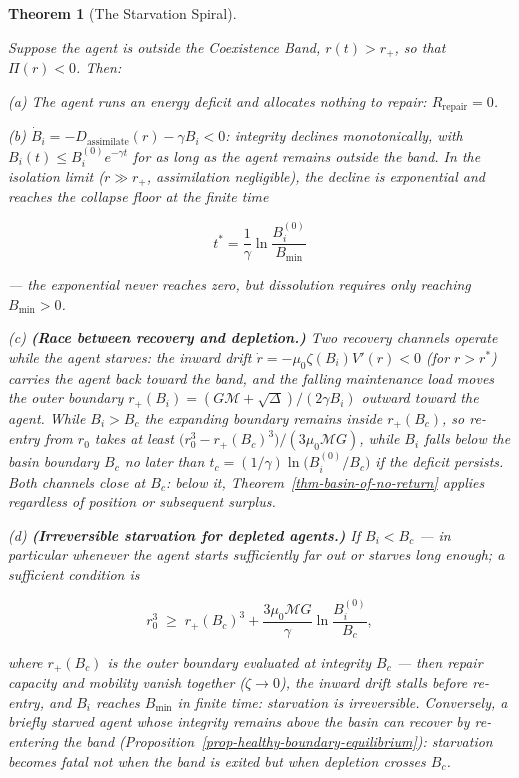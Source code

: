 \documentclass[11pt]{article}
\theoremstyle{plain}
\newtheorem{theorem}{Theorem}
\theoremstyle{definition}
\theoremstyle{remark}
\begin{document}
\begin{theorem}[The Starvation Spiral]
\label{thm-starvation-spiral}

Suppose the agent is outside the Coexistence Band, $r(t) > r_+$, so that $\Pi(r) < 0$. Then:

(a) The agent runs an energy deficit and allocates nothing to repair: $R_{\text{repair}} = 0$.

(b) $\dot{B}_i = -D_{\text{assimilate}}(r) - \gamma B_i < 0$: integrity declines monotonically, with $B_i(t) \leq B_i^{(0)} e^{-\gamma t}$ for as long as the agent remains outside the band. In the isolation limit ($r \gg r_+$, assimilation negligible), the decline is exponential and reaches the collapse floor at the finite time

$$t^* = \frac{1}{\gamma} \ln \frac{B_i^{(0)}}{B_{\min}}$$

— the exponential never reaches zero, but dissolution requires only reaching $B_{\min} > 0$.

(c) \textbf{(Race between recovery and depletion.)} Two recovery channels operate while the agent starves: the inward drift $\dot{r} = -\mu_0\zeta(B_i)V'(r) < 0$ (for $r > r^*$) carries the agent back toward the band, and the falling maintenance load moves the outer boundary $r_+(B_i) = (G\mathcal{M} + \sqrt{\Delta})/(2\gamma B_i)$ outward toward the agent. While $B_i > B_c$ the expanding boundary remains inside $r_+(B_c)$, so re-entry from $r_0$ takes at least $\bigl(r_0^3 - r_+(B_c)^3\bigr)/(3\mu_0\mathcal{M}G)$, while $B_i$ falls below the basin boundary $B_c$ no later than $t_c = (1/\gamma)\ln\bigl(B_i^{(0)}/B_c\bigr)$ if the deficit persists. Both channels close at $B_c$: below it, Theorem~\ref{thm-basin-of-no-return} applies regardless of position or subsequent surplus.

(d) \textbf{(Irreversible starvation for depleted agents.)} If $B_i < B_c$ — in particular whenever the agent starts sufficiently far out or starves long enough; a sufficient condition is

$$r_0^3 \;\geq\; r_+(B_c)^3 + \frac{3\mu_0\mathcal{M}G}{\gamma}\ln\frac{B_i^{(0)}}{B_c},$$

where $r_+(B_c)$ is the outer boundary evaluated at integrity $B_c$ — then repair capacity and mobility vanish together ($\zeta \to 0$), the inward drift stalls before re-entry, and $B_i$ reaches $B_{\min}$ in finite time: starvation is irreversible. Conversely, a briefly starved agent whose integrity remains above the basin can recover by re-entering the band (Proposition~\ref{prop-healthy-boundary-equilibrium}): starvation becomes fatal not when the band is exited but when depletion crosses $B_c$.
\end{theorem}
\end{document}
